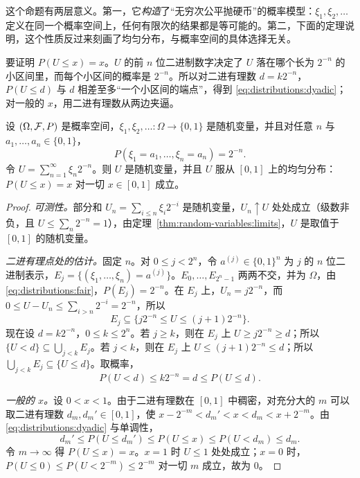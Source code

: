 这个命题有两层意义。第一，它\emph{构造}了“无穷次公平抛硬币”的概率模型：$\xi_1,\xi_2,\dots$ 定义在同一个概率空间上，任何有限次的结果都是等可能的。第二，下面的定理说明，这个性质反过来刻画了均匀分布，与概率空间的具体选择无关。

\begin{remark}[证明思路]
要证明 $P(U\leqslant x)=x$。$U$ 的前 $n$ 位二进制数字决定了 $U$ 落在哪个长为 $2^{-n}$ 的小区间里，而每个小区间的概率是 $2^{-n}$。所以对二进有理数 $d=k2^{-n}$，$P(U\leqslant d)$ 与 $d$ 相差至多“一个小区间的端点”，得到 \eqref{eq:distributions:dyadic}；对一般的 $x$，用二进有理数从两边夹逼。
\end{remark}

\begin{theorem}[公平硬币给出均匀分布]\label{thm:distributions:coins-to-uniform}
设 $(\Omega,\mathcal{F},P)$ 是概率空间，$\xi_1,\xi_2,\dots:\Omega\to\{0,1\}$ 是随机变量，并且对任意 $n$ 与 $a_1,\dots,a_n\in\{0,1\}$，
\begin{equation}\label{eq:distributions:fair}
P(\xi_1=a_1,\dots,\xi_n=a_n)=2^{-n}.
\end{equation}
令 $U=\sum_{n=1}^\infty\xi_n2^{-n}$。则 $U$ 是随机变量，并且 $U$ 服从 $[0,1]$ 上的均匀分布：$P(U\leqslant x)=x$ 对一切 $x\in[0,1]$ 成立。
\end{theorem}
\begin{proof}
\emph{可测性。}部分和 $U_n=\sum_{i\leqslant n}\xi_i2^{-i}$ 是随机变量，$U_n\uparrow U$ 处处成立（级数非负，且 $U\leqslant\sum_n2^{-n}=1$），由定理~\ref{thm:random-variables:limits}，$U$ 是取值于 $[0,1]$ 的随机变量。

\emph{二进有理点处的估计。}固定 $n$。对 $0\leqslant j<2^n$，令 $a^{(j)}\in\{0,1\}^n$ 为 $j$ 的 $n$ 位二进制表示，$E_j=\{(\xi_1,\dots,\xi_n)=a^{(j)}\}$。$E_0,\dots,E_{2^n-1}$ 两两不交，并为 $\Omega$，由 \eqref{eq:distributions:fair}，$P(E_j)=2^{-n}$。在 $E_j$ 上，$U_n=j2^{-n}$，而 $0\leqslant U-U_n\leqslant\sum_{i>n}2^{-i}=2^{-n}$，所以
\[
E_j\subseteq\{j2^{-n}\leqslant U\leqslant(j+1)2^{-n}\}.
\]
现在设 $d=k2^{-n}$，$0\leqslant k\leqslant2^n$。若 $j\geqslant k$，则在 $E_j$ 上 $U\geqslant j2^{-n}\geqslant d$；所以 $\{U<d\}\subseteq\bigcup_{j<k}E_j$。若 $j<k$，则在 $E_j$ 上 $U\leqslant(j+1)2^{-n}\leqslant d$；所以 $\bigcup_{j<k}E_j\subseteq\{U\leqslant d\}$。取概率，
\begin{equation}\label{eq:distributions:dyadic}
P(U<d)\leqslant k2^{-n}=d\leqslant P(U\leqslant d).
\end{equation}

\emph{一般的 $x$。}设 $0<x<1$。由于二进有理数在 $[0,1]$ 中稠密，对充分大的 $m$ 可以取二进有理数 $d_m,d_m'\in[0,1]$，使 $x-2^{-m}<d_m'<x<d_m<x+2^{-m}$。由 \eqref{eq:distributions:dyadic} 与单调性，
\[
d_m'\leqslant P(U\leqslant d_m')\leqslant P(U\leqslant x)\leqslant P(U<d_m)\leqslant d_m.
\]
令 $m\to\infty$ 得 $P(U\leqslant x)=x$。$x=1$ 时 $U\leqslant1$ 处处成立；$x=0$ 时，$P(U\leqslant0)\leqslant P(U<2^{-m})\leqslant2^{-m}$ 对一切 $m$ 成立，故为 $0$。
\end{proof}

